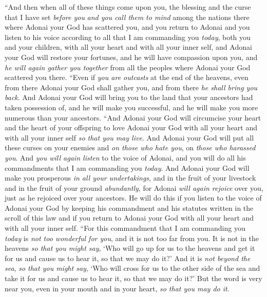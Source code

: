 \begin{biblechapter} %
\verse “And then when all of these things come upon you, the blessing and the curse that I have set \textit{before you} \textit{and you call them to mind} among the nations there where Adonai your God has scattered you,
\verse and you return to Adonai and you listen to his voice according to all that I am commanding you \textit{today}, both you and your children, with all your heart and with all your inner self,
\verse and Adonai your God will restore your fortunes, and he will have compassion upon you, and \textit{he will again gather you together} from all the peoples where Adonai your God scattered you there.
\verse “Even if \textit{you are outcasts} at the end of the heavens, even from there Adonai your God shall gather you, and from there \textit{he shall bring you back}.
\verse And Adonai your God will bring you to the land that your ancestors had taken possession of, and he will make you successful, and he will make you more numerous than your ancestors.
\verse “And Adonai your God will circumcise your heart and the heart of your offspring to love Adonai your God with all your heart and with all your inner self \textit{so that you may live}.
\verse And Adonai your God will put all these curses on your enemies and \textit{on those who hate you}, on \textit{those who harassed you}.
\verse And \textit{you will again listen} to the voice of Adonai, and you will do all his commandments that I am commanding you \textit{today}.
\verse And Adonai your God will make you prosperous \textit{in all your undertakings}, and in the fruit of your livestock and in the fruit of your ground \textit{abundantly}, for Adonai \textit{will again rejoice} over you, just as he rejoiced over your ancestors.
\verse He will do this if you listen to the voice of Adonai your God by keeping his commandment and his statutes written in the scroll of this law and if you return to Adonai your God with all your heart and with all your inner self.
\verse “For this commandment that I am commanding you \textit{today} is \textit{not too wonderful for you}, and it is not too far from you.
\verse It is not in the heavens \textit{so that you might say}, ‘Who will go up for us to the heavens and get it for us and cause us to hear it, so that we may do it?’
\verse And it is \textit{not beyond the sea}, \textit{so that you might say}, ‘Who will cross for us to the other side of the sea and take it for us and cause us to hear it, so that we may do it?’
\verse But the word is very near you, even in your mouth and in your heart, \textit{so that you may do it}.

\end{biblechapter}
